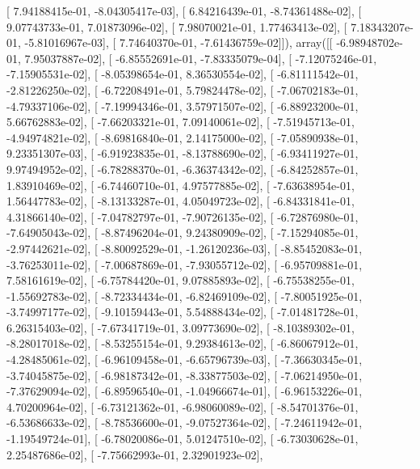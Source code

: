 \documentclass{article}
\begin{document}
       [  7.94188415e-01,  -8.04305417e-03],
       [  6.84216439e-01,  -8.74361488e-02],
       [  9.07743733e-01,   7.01873096e-02],
       [  7.98070021e-01,   1.77463413e-02],
       [  7.18343207e-01,  -5.81016967e-03],
       [  7.74640370e-01,  -7.61436759e-02]]), array([[ -6.98948702e-01,   7.95037887e-02],
       [ -6.85552691e-01,  -7.83335079e-04],
       [ -7.12075246e-01,  -7.15905531e-02],
       [ -8.05398654e-01,   8.36530554e-02],
       [ -6.81111542e-01,  -2.81226250e-02],
       [ -6.72208491e-01,   5.79824478e-02],
       [ -7.06702183e-01,  -4.79337106e-02],
       [ -7.19994346e-01,   3.57971507e-02],
       [ -6.88923200e-01,   5.66762883e-02],
       [ -7.66203321e-01,   7.09140061e-02],
       [ -7.51945713e-01,  -4.94974821e-02],
       [ -8.69816840e-01,   2.14175000e-02],
       [ -7.05890938e-01,   9.23351307e-03],
       [ -6.91923835e-01,  -8.13788690e-02],
       [ -6.93411927e-01,   9.97494952e-02],
       [ -6.78288370e-01,  -6.36374342e-02],
       [ -6.84252857e-01,   1.83910469e-02],
       [ -6.74460710e-01,   4.97577885e-02],
       [ -7.63638954e-01,   1.56447783e-02],
       [ -8.13133287e-01,   4.05049723e-02],
       [ -6.84331841e-01,   4.31866140e-02],
       [ -7.04782797e-01,  -7.90726135e-02],
       [ -6.72876980e-01,  -7.64905043e-02],
       [ -8.87496204e-01,   9.24380909e-02],
       [ -7.15294085e-01,  -2.97442621e-02],
       [ -8.80092529e-01,  -1.26120236e-03],
       [ -8.85452083e-01,  -3.76253011e-02],
       [ -7.00687869e-01,  -7.93055712e-02],
       [ -6.95709881e-01,   7.58161619e-02],
       [ -6.75784420e-01,   9.07885893e-02],
       [ -6.75538255e-01,  -1.55692783e-02],
       [ -8.72334434e-01,  -6.82469109e-02],
       [ -7.80051925e-01,  -3.74997177e-02],
       [ -9.10159443e-01,   5.54888434e-02],
       [ -7.01481728e-01,   6.26315403e-02],
       [ -7.67341719e-01,   3.09773690e-02],
       [ -8.10389302e-01,  -8.28017018e-02],
       [ -8.53255154e-01,   9.29384613e-02],
       [ -6.86067912e-01,  -4.28485061e-02],
       [ -6.96109458e-01,  -6.65796739e-03],
       [ -7.36630345e-01,  -3.74045875e-02],
       [ -6.98187342e-01,  -8.33877503e-02],
       [ -7.06214950e-01,  -7.37629094e-02],
       [ -6.89596540e-01,  -1.04966674e-01],
       [ -6.96153226e-01,   4.70200964e-02],
       [ -6.73121362e-01,  -6.98060089e-02],
       [ -8.54701376e-01,  -6.53686633e-02],
       [ -8.78536600e-01,  -9.07527364e-02],
       [ -7.24611942e-01,  -1.19549724e-01],
       [ -6.78020086e-01,   5.01247510e-02],
       [ -6.73030628e-01,   2.25487686e-02],
       [ -7.75662993e-01,   2.32901923e-02],
\end{document}
